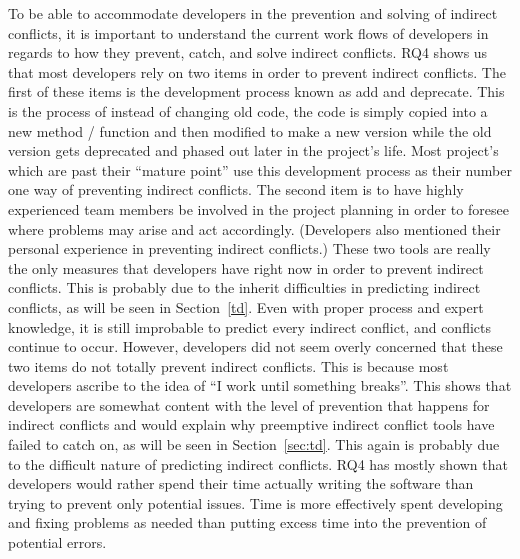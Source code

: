 \documentclass[conference]{IEEEtran}
\begin{document}
To be able to accommodate developers in the prevention and solving of indirect conflicts, it is important to understand the current
work flows of developers in regards to how they prevent, catch, and solve indirect conflicts. RQ4 shows us that most developers rely on
two items in order to prevent indirect conflicts. The first of these items is the development process known as add and deprecate. This
is the process of instead of changing old code, the code is simply copied into a new method / function and then modified to make a new 
version while the old version gets deprecated and phased out later in the project's life. Most project's which are past their ``mature point''
use this development process as their number one way of preventing indirect conflicts. The second item is to have highly experienced team
members be involved in the project planning in order to foresee where problems may arise and act accordingly. (Developers also mentioned
their personal experience in preventing indirect conflicts.) These two tools are really the only measures that developers have right now
in order to prevent indirect conflicts. This is probably due to the inherit difficulties in predicting indirect conflicts, as will be seen in
Section~\ref{td}. Even with proper process and expert knowledge, it is still improbable to predict every indirect conflict, and conflicts 
continue to occur. However, developers did not seem overly concerned that these two items do not totally prevent indirect conflicts. This
is because most developers ascribe to the idea of ``I work until something breaks''. This shows that developers are somewhat content with
the level of prevention that happens for indirect conflicts and would explain why preemptive indirect conflict tools have failed to catch on,
as will be seen in Section~\ref{sec:td}. This again is probably due to the difficult nature of predicting indirect conflicts. RQ4 has mostly
shown that developers would rather spend their time actually writing the software than trying to prevent only potential issues. Time is
more effectively spent developing and fixing problems as needed than putting excess time into the prevention of potential errors.
\end{document}
